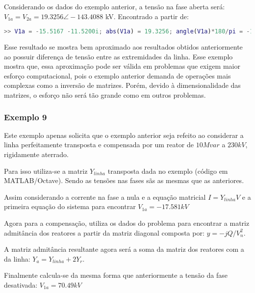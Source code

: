 Considerando os dados do exemplo anterior, a tensão na fase aberta será: $V_{1a} = V_{2a} = 19.3256 \angle -143.4088$ kV. Encontrado a partir de:



\begin{lstlisting}[language=Matlab,style=consolestyle]
>> V1a = -15.5167 -11.5200i; abs(V1a) = 19.3256; angle(V1a)*180/pi = -143.4088;
\end{lstlisting}

Esse resultado se mostra bem aproximado aos resultados obtidos anteriormente ao possuir diferença de tensão entre as extremidades da linha. Esse exemplo mostra que, essa aproximação pode ser válida em problemas que exigem maior esforço computacional, pois o exemplo anterior demanda de operações mais complexas como a inversão de matrizes. Porém, devido à dimensionalidade das matrizes, o esforço não será tão grande como em outros problemas.

\subsubsection*{Exemplo 9}

Este exemplo apenas solicita que o exemplo anterior seja refeito ao considerar a linha perfeitamente transposta e compensada por um reator de $10 Mvar$ a $230 kV$, rigidamente aterrado.

Para isso utiliza-se a matriz $Y_{linha}$ transposta dada no exemplo (código em MATLAB/Octave). Sendo as tensões nas fases sãs as mesmas que as anteriores.

Assim considerando a corrente na fase a nula e a equação matricial $I = Y_{linha} V$ e a primeira equação do sistema para encontrar $V_{1a} = -17.581 kV$



Agora para a compensação, utiliza os dados do problema para encontrar a matriz admitância dos reatores a partir da matriz diagonal composta por: $y = -j Q/V_n^2$.

A matriz admitância resultante agora será a soma da matriz dos reatores com a da linha: $Y_a = Y_{linha} + 2Y_r$. 

Finalmente calcula-se da mesma forma que anteriormente a tensão da fase desativada: $V_{1a} = 70.49 kV$



